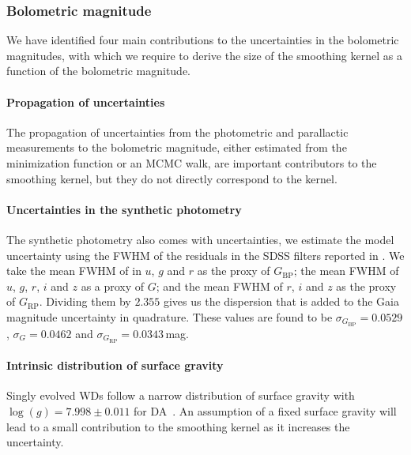 \documentclass[fleqn,usenatbib]{mnras}
\begin{document}
\subsubsection{Bolometric magnitude}
We have identified four main contributions to the uncertainties in the
bolometric magnitudes, with which we require to derive the size of the
smoothing kernel as a function of the bolometric magnitude.

\paragraph{Propagation of uncertainties \hfill\\}
\label{sec:propagation}
The propagation of uncertainties from the photometric and parallactic
measurements to the bolometric magnitude, either estimated from the minimization
function or an MCMC walk, are important contributors to the smoothing kernel,
but they do not directly correspond to the kernel.

\paragraph{Uncertainties in the synthetic photometry \hfill\\}
\label{sec:synthetic_photometry}
The synthetic photometry also comes with uncertainties, we estimate the model
uncertainty using the FWHM of the residuals in the SDSS filters reported in
\citet{2006AJ....132.1221H}. We take the mean FWHM of in $u$, $g$ and $r$ as
the proxy of $G_{\mathrm{BP}}$; the mean FWHM of $u$, $g$, $r$, $i$ and $z$
as a proxy of $G$; and the mean FWHM of $r$, $i$ and $z$ as the proxy of
$G_{\mathrm{RP}}$. Dividing them by $2.355$ gives us the dispersion that is
added to the Gaia magnitude uncertainty in quadrature. These values are found
to be $\sigma_{G_{\mathrm{BP}}}=0.0529$,
$\sigma_{G}=0.0462$ and $\sigma_{G_{\mathrm{RP}}}=0.0343$\,mag.

\paragraph{Intrinsic distribution of surface gravity \hfill\\}
\label{sec:logg_intrinsic_dispersion}
Singly evolved WDs follow a narrow distribution of surface gravity with
$\log(g)=7.998 \pm 0.011$ for DA~\citep{2021MNRAS.507.4646K}. An assumption
of a fixed surface gravity will lead to a small contribution to the smoothing
kernel as it increases the uncertainty.
\end{document}
